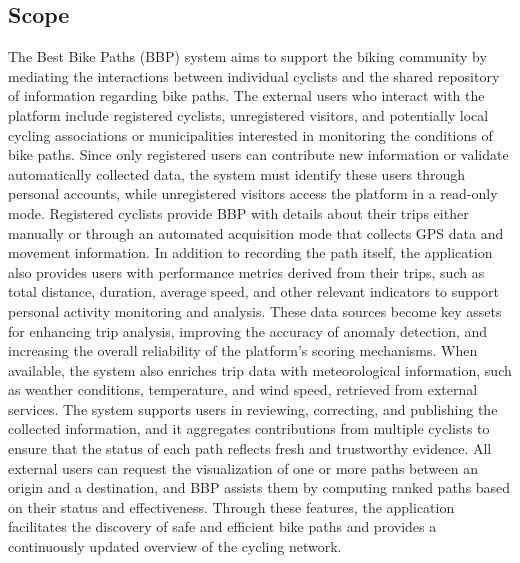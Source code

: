 \subsection{Scope}
The Best Bike Paths (BBP) system aims to support the biking community by mediating the interactions between individual cyclists and the shared repository of information regarding bike paths. The external users who interact with the platform include registered cyclists, unregistered visitors, and potentially local cycling associations or municipalities interested in monitoring the conditions of bike paths. Since only registered users can contribute new information or validate automatically collected data, the system must identify these users through personal accounts, while unregistered visitors access the platform in a read-only mode. Registered cyclists provide BBP with details about their trips either manually or through an automated acquisition mode that collects GPS data and movement information. In addition to recording the path itself, the application also provides users with performance metrics derived from their trips, such as total distance, duration, average speed, and other relevant indicators to support personal activity monitoring and analysis. These data sources become key assets for enhancing trip analysis, improving the accuracy of anomaly detection, and increasing the overall reliability of the platform’s scoring mechanisms.
When available, the system also enriches trip data with meteorological information, such as weather conditions, temperature, and wind speed, retrieved from external services.
The system supports users in reviewing, correcting, and publishing the collected information, and it aggregates contributions from multiple cyclists to ensure that the status of each path reflects fresh and trustworthy evidence. All external users can request the visualization of one or more paths between an origin and a destination, and BBP assists them by computing ranked paths based on their status and effectiveness. Through these features, the application facilitates the discovery of safe and efficient bike paths and provides a continuously updated overview of the cycling network.



